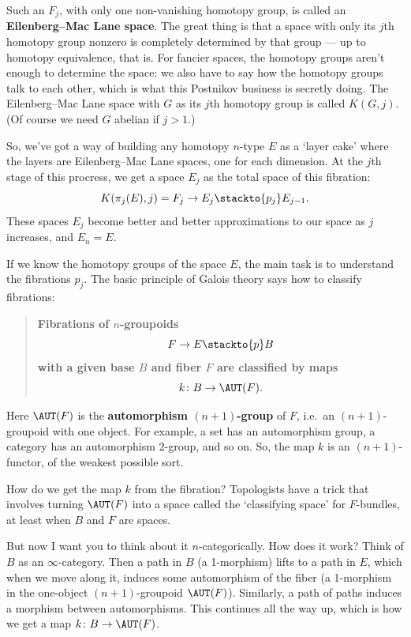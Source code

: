 \documentclass[12pt]{amsart}
\begin{document}
Such an $F_j$, with only one non-vanishing homotopy group, is called
an \textbf{Eilenberg--Mac Lane space}.  The great thing is that a
space with only its $j$th homotopy group nonzero is completely
determined by that group --- up to homotopy equivalence, that is.  For
fancier spaces, the homotopy groups aren't enough to determine the
space: we also have to say how the homotopy groups talk to each other,
which is what this Postnikov business is secretly doing.  The
Eilenberg--Mac Lane space with $G$ as its $j$th homotopy group is
called $K(G,j)$.  (Of course we need $G$ abelian if $j > 1$.)  

So, we've got a way of building any homotopy $n$-type $E$ as a `layer cake' 
where the layers are Eilenberg--Mac Lane spaces, one for each dimension.
At the $j$th stage of this procress, we get a space $E_j$ as the 
total space of this fibration:
\[           K(\pi_j(E), j) = F_j \to E_j \stackto{p_j} E_{j-1} . \]
These spaces $E_j$ become better and better approximations to our space
as $j$ increases, and $E_n = E$. 

If we know the homotopy groups of the space $E$, the main task is
to understand the fibrations $p_j$.  The basic principle of Galois 
theory says how to classify fibrations:

\begin{quote}
\textbf{Fibrations of $n$-groupoids
\[   F\to E\stackto{p} B\]
with a given base $B$ and fiber $F$ are classified by maps
\[   k\colon B\to \AUT(F).\]
}
\end{quote}

Here $\AUT(F)$ is the \textbf{automorphism $(n+1)$-group} of
$F$, i.e.\ an $(n+1)$-groupoid with one object. For example, a set
has an automorphism group, a category has an automorphism 2-group, and
so on.  So, the map $k$ is an $(n+1)$-functor, of the weakest possible sort.

How do we get the map $k$ from the fibration?
Topologists have a trick that involves turning $\AUT(F)$ into a space
called the `classifying space' for $F$-bundles, 
at least when $B$ and $F$ are spaces.  

But now I want you to think about it $n$-categorically.
How does it work?  Think of $B$ as an $\infty$-category.  Then a
path in $B$ (a 1-morphism) lifts to a path in $E$, which when we move
along it, induces some automorphism of the fiber (a 1-morphism in
the one-object $(n+1)$-groupoid $\AUT(F)$).  Similarly, a path of
paths induces a morphism between automorphisms.  This continues all the
way up, which is how we get a map $k\colon B\to\AUT(F)$.
\end{document}
